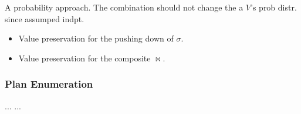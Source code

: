 \documentclass{article}
\begin{document}
A probability approach. The combination should not change the a $V$'s prob distr. since assumped indpt.
\begin{itemize}
\item Value preservation for the pushing down of $\sigma$. 
\item Value preservation for the composite $\bowtie$. 
\end{itemize}
\subsubsection{Plan Enumeration}

\begin{thebibliography}{99}
 ...
 ...
\end{thebibliography}
\end{document}
